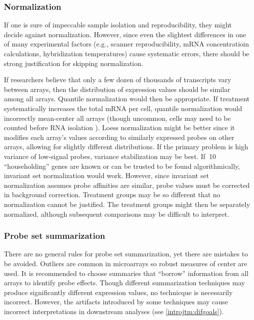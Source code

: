 \subsubsection{Normalization}

If one is sure of impeccable sample isolation and
reproducibility, they might decide against normalization. 
However, since even the slightest differences in one of many experimental factors 
(e.g., scanner reproducibility, mRNA concentratioin calculations, hybridization
temperatures) cause systematic errors, there should be strong 
justification for skipping normalization.

If researchers believe that only a few dozen
of thousands of transcripts vary between arrays, then the distribution
of expression values should be similar among all arrays. Quantile
normalization would then be appropriate. If treatment
systematically increases the total mRNA per cell, quantile
normalization would incorrectly mean-center all arrays 
(though uncommon, cells may need to be counted before RNA isolation \cite{Loven:2012km}).
Loess normalization might be better since it 
modifies each array's values according to similarly expressed 
probes on other arrays, allowing for slightly different distributions.
If the primary problem is high variance of low-signal probes, variance
stabilization may be best. If $~$10 ``householding'' genes are known
or can be trusted to be found algorithmically, invariant set normalization
would work. However, since invariant set normalization assumes probe affinities
are similar, probe values must be corrected in background correction.
Treatment groups may be so different that
no normalization cannot be justified. The treatment groups might then
be separately normalized, although subsequent comparisons may be difficult to interpret.

\subsubsection{Probe set summarization}

There are no general rules for probe set summarization, yet
there are mistakes to be avoided. Outliers are common in microarrays
so robust measures of center are used.
It is recommended to choose summaries
that ``borrow'' information from all arrays to identify probe effects.
Though different summarization techniques may produce significantly
different expression values, no technicque is necessarily incorrect.
However, the artifacts introduced by some techniques may
cause incorrect interpretations in downstream analyses (see \ref{introjtm:difgoals}).


